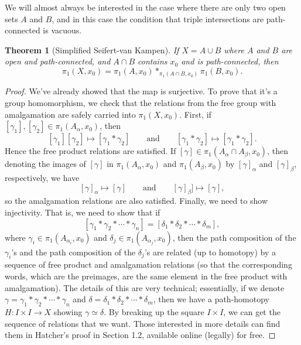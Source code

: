 \documentclass{article}
\newtheorem{thm}{Theorem}[section]
\theoremstyle{definition}
\theoremstyle{remark}
\numberwithin{figure}{section}
\begin{document}
We will almost always be interested in the case where there are only two open sets $A$ and $B$, and in this case the condition that triple intersections are path-connected is vacuous.

\begin{thm}[Simplified Seifert-van Kampen]\label{thm:simplified van Kampen}
	If $X = A \cup B$ where $A$ and $B$ are open and path-connected, and $A \cap B$ contains $x_0$ and is path-connected, then
	\[
	\pi_1(X, x_0) = \pi_1(A, x_0) *_{\pi_1(A \cap B, x_0)} \pi_1(B, x_0).
	\]
\end{thm}

\begin{proof}
	We've already showed that the map is surjective. To prove that it's a group homomorphism, we check that the relations from the free group with amalgamation are safely carried into $\pi_1(X, x_0)$. First, if $[\gamma_1], [\gamma_2] \in \pi_1(A_\alpha, x_0)$, then
	\[
	[\gamma_1][\gamma_2] \mapsto [\gamma_1 * \gamma_2] \qquad\text{and}\qquad [\gamma_1 * \gamma_2] \mapsto [\gamma_1 * \gamma_2].
	\]
	Hence the free product relations are satisfied. If $[\gamma] \in \pi_1(A_\alpha \cap A_\beta, x_0)$, then denoting the images of $[\gamma]$ in $\pi_1(A_\alpha, x_0)$ and $\pi_1(A_\beta, x_0)$ by $[\gamma]_\alpha$ and $[\gamma]_\beta$, respectively, we have
	\[
	[\gamma]_\alpha \mapsto [\gamma] \qquad\text{and}\qquad [\gamma]_\beta] \mapsto [\gamma],
	\]
	so the amalgamation relations are also satisfied. Finally, we need to show injectivity. That is, we need to show that if
	\[
	[\gamma_1 * \gamma_2 * \cdots * \gamma_n] = [\delta_1 * \delta_2 * \cdots * \delta_m],
	\]
	where $\gamma_i \in \pi_1(A_{\alpha_i}, x_0)$ and $\delta_j \in \pi_1(A_{\alpha_j}, x_0)$, then the path composition of the $\gamma_i$'s and the path composition of the $\delta_j$'s are related (up to homotopy) by a sequence of free product and amalgamation relations (so that the corresponding words, which are the preimages, are the same element in the free product with amalgamation). The details of this are very technical; essentially, if we denote $\gamma = \gamma_1 * \gamma_2 * \cdots * \gamma_n$ and $\delta = \delta_1 * \delta_2 * \cdots * \delta_m$, then we have a path-homotopy $H : I \times I \to X$ showing $\gamma \simeq \delta$. By breaking up the square $I \times I$, we can get the sequence of relations that we want. Those interested in more details can find them in Hatcher's \cite{H} proof in Section 1.2, available online (legally) for free.
\end{proof}
\end{document}
